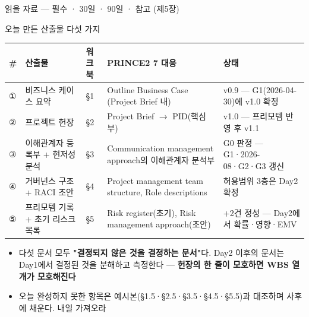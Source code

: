 \begin{frame}[allowframebreaks=1.0]{읽을 자료 — 필수 · 30일 · 90일 · 참고 (제5장)}
\par\smallskip{}\nobreak
{}
\end{frame}

\begin{frame}[allowframebreaks=1.0]{오늘 만든 산출물 다섯 가지}
\small
{\footnotesize\setlength{\tabcolsep}{3pt}\renewcommand{\arraystretch}{1.12}
\begin{tabular}{@{}>{\raggedright\arraybackslash}p{}>{\raggedright\arraybackslash}p{}>{\raggedright\arraybackslash}p{}>{\raggedright\arraybackslash}p{}>{\raggedright\arraybackslash}p{}@{}}
\toprule
\textbf{\#} & \textbf{산출물} & \textbf{워크북} & \textbf{PRINCE2 7 대응} & \textbf{상태} \\
\midrule
① & 비즈니스 케이스 요약 & §1 & Outline Business Case (Project Brief 내) & v0.9 — G1(2026-04-30)에 v1.0 확정 \\
② & 프로젝트 헌장 & §2 & Project Brief $\rightarrow$ PID(핵심부) & v1.0 — 프리모템 반영 후 v1.1 \\
③ & 이해관계자 등록부 + 현저성 분석 & §3 & Communication management approach의 이해관계자 분석부 & G0 판정 — G1·2026-08·G2·G3 갱신 \\
④ & 거버넌스 구조 + RACI 초안 & §4 & Project management team structure, Role descriptions & 허용범위 3층은 Day2 확정 \\
⑤ & 프리모템 기록 + 초기 리스크 목록 & §5 & Risk register(초기), Risk management approach(초안) & 13+2건 정성 — Day2에서 확률·영향·EMV \\
\bottomrule
\end{tabular}}
\par\smallskip
\begin{itemize}
\item\relax 다섯 문서 모두 \textbf{"결정되지 않은 것을 결정하는 문서"}다. Day2 이후의 문서는 Day1에서 결정된 것을 분해하고 측정한다 — \textbf{헌장의 한 줄이 모호하면 WBS 열 개가 모호해진다}
\item\relax 오늘 완성하지 못한 항목은 예시본(§1.5·§2.5·§3.5·§4.5·§5.5)과 대조하며 사후에 채운다. 내일 가져오라
\end{itemize}
\end{frame}

